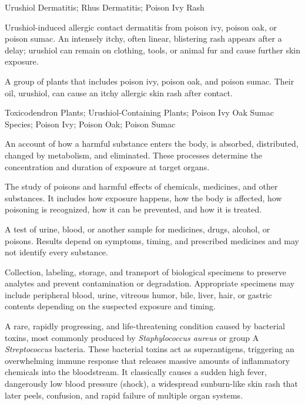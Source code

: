 \synonyms
Urushiol Dermatitis; Rhus Dermatitis; Poison Ivy Rash

 Urushiol-induced allergic contact dermatitis from poison ivy, poison oak, or poison sumac. An intensely itchy, often linear, blistering rash appears after a delay; urushiol can remain on clothing, tools, or animal fur and cause further skin exposure.

 A group of plants that includes poison ivy, poison oak, and poison sumac. Their oil, urushiol, can cause an itchy allergic skin rash after contact.

\synonyms
Toxicodendron Plants; Urushiol-Containing Plants; Poison Ivy Oak Sumac Species; Poison Ivy; Poison Oak; Poison Sumac

 An account of how a harmful substance enters the body, is absorbed, distributed, changed by metabolism, and eliminated. These processes determine the concentration and duration of exposure at target organs.

 The study of poisons and harmful effects of chemicals, medicines, and other substances. It includes how exposure happens, how the body is affected, how poisoning is recognized, how it can be prevented, and how it is treated.

 A test of urine, blood, or another sample for medicines, drugs, alcohol, or poisons. Results depend on symptoms, timing, and prescribed medicines and may not identify every substance.

 Collection, labeling, storage, and transport of biological specimens to preserve
analytes and prevent contamination or degradation. Appropriate specimens may include
peripheral blood, urine, vitreous humor, bile, liver, hair, or gastric contents
depending on the suspected exposure and timing.

 A rare, rapidly progressing, and life-threatening condition caused by bacterial toxins, most commonly produced by \textit{Staphylococcus aureus} or group A \textit{Streptococcus} bacteria. These bacterial toxins act as superantigens, triggering an overwhelming immune response that releases massive amounts of inflammatory chemicals into the bloodstream. It classically causes a sudden high fever, dangerously low blood pressure (shock), a widespread sunburn-like skin rash that later peels, confusion, and rapid failure of multiple organ systems.


